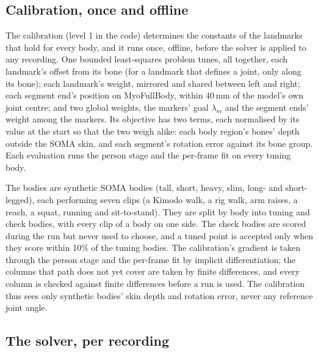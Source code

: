\documentclass[11pt]{article}
\begin{document}
\subsection{Calibration, once and offline}
\label{sec:calibration}

The calibration (level 1 in the code) determines the constants of the landmarks that hold for every body, and it runs
once, offline, before the solver is applied to any recording. One bounded least-squares problem tunes, all together,
each landmark's offset from its bone (for a landmark that defines a joint, only along its bone); each landmark's
weight, mirrored and shared between left and right; each segment end's position on MyoFullBody, within 40\,mm of the
model's own joint centre; and two global weights, the markers' goal $\lambda_m$ and the segment ends' weight among the
markers. Its objective has two terms, each normalised by its value at the start so that the two weigh alike: each body
region's bones' depth outside the SOMA skin, and each segment's rotation error against its bone group. Each evaluation
runs the person stage and the per-frame fit on every tuning body.

The bodies are synthetic SOMA bodies (tall, short, heavy, slim, long- and short-legged), each performing seven clips (a
Kimodo walk, a rig walk, arm raises, a reach, a squat, running and sit-to-stand). They are split by body into tuning
and check bodies, with every clip of a body on one side. The check bodies are scored during the run but never used to
choose, and a tuned point is accepted only when they score within 10\% of the tuning bodies. The calibration's
gradient is taken through the person stage and the per-frame fit by implicit differentiation; the columns that path
does not yet cover are taken by finite differences, and every column is checked against finite differences before a
run is used. The calibration thus sees only synthetic bodies' skin depth and rotation error, never any reference joint
angle.

\subsection{The solver, per recording}
\end{document}
